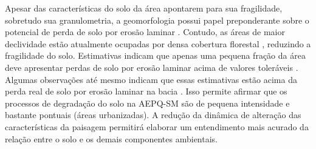 Apesar das características do solo da área apontarem para sua fragilidade, sobretudo sua granulometria, a geomorfologia possui papel preponderante sobre o potencial de perda de solo por erosão laminar \cite{Miguel2010}. Contudo, as áreas de maior declividade estão atualmente ocupadas por densa cobertura florestal \cite{SamuelRosaEtAl2011a}, reduzindo a fragilidade do solo. Estimativas indicam que apenas uma pequena fração da área deve apresentar perdas de solo por erosão laminar acima de valores toleráveis \cite{Miguel2010}. Algumas observações até mesmo indicam que essas estimativas estão acima da perda real de solo por erosão laminar na bacia \cite{Branco1998, MouraBueno2012}. Isso permite afirmar que os processos de degradação do solo na AEPQ-SM são de pequena intensidade e bastante pontuais (áreas urbanizadas). A redução da dinâmica de alteração das características da paisagem permitirá elaborar um entendimento mais acurado da relação entre o solo e os demais componentes ambientais.


